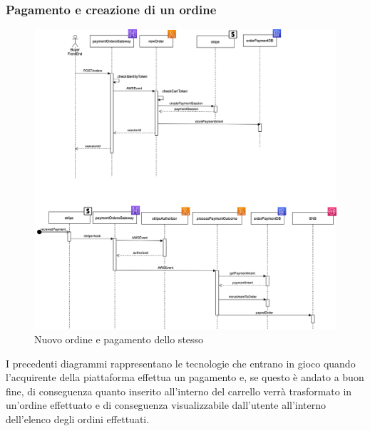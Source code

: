 \subsubsection{Pagamento e creazione di un ordine}
\begin{figure}[H]
	\centering
	\includegraphics[scale=0.5]{Immagini/Backend/Diagrammiseq.png}
	\caption{Nuovo ordine e pagamento dello stesso}
	\label{fig:Diagrammiseq}
\end{figure}
I precedenti diagrammi rappresentano le tecnologie che entrano in gioco quando l'acquirente della piattaforma effettua un pagamento e, se questo è andato a buon fine, di conseguenza quanto inserito all'interno del carrello verrà trasformato in un'ordine effettuato e di conseguenza visualizzabile dall'utente all'interno dell'elenco degli ordini effettuati.


